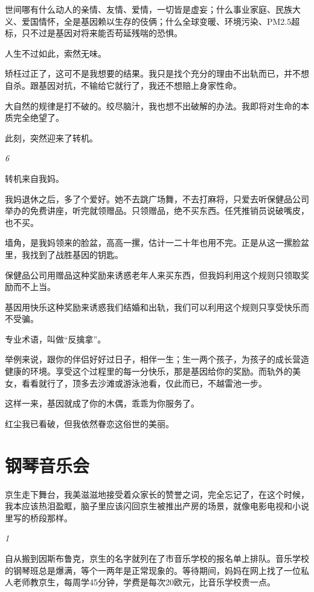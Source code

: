 \documentclass[twoside,openright,headings=optiontohead]{ctexbook} %
\begin{document}
{世间哪有什么动人的亲情、友情、爱情，一切皆是虚妄；什么事业家庭、民族大义、爱国情怀，全是基因赖以生存的伎俩；什么全球变暖、环境污染、PM2.5超标，只不过是基因对将来能否苟延残喘的恐惧。

人生不过如此，索然无味。

矫枉过正了，这可不是我想要的结果。我只是找个充分的理由不出轨而已，并不想自杀。跟基因对抗，不输给它就行了，我还不想赔上身家性命。

大自然的规律是打不破的。绞尽脑汁，我也想不出破解的办法。我即将对生命的本质完全绝望了。

此刻，突然迎来了转机。

\emph{6}

转机来自我妈。

我妈退休之后，多了个爱好。她不去跳广场舞，不去打麻将，只爱去听保健品公司举办的免费讲座，听完就领赠品。只领赠品，绝不买东西。任凭推销员说破嘴皮，也不买。

墙角，是我妈领来的脸盆，高高一摞，估计一二十年也用不完。正是从这一摞脸盆里，我找到了战胜基因的钥匙。

保健品公司用赠品这种奖励来诱惑老年人来买东西，但我妈利用这个规则只领取奖励而不上当。

基因用快乐这种奖励来诱惑我们结婚和出轨，我们可以利用这个规则只享受快乐而不受骗。

专业术语，叫做``反擒拿''。

举例来说，跟你的伴侣好好过日子，相伴一生；生一两个孩子，为孩子的成长营造健康的环境。享受这个过程里的每一分快乐，那是基因给你的奖励。而轨外的美女，看看就行了，顶多去沙滩或游泳池看，仅此而已，不越雷池一步。

这样一来，基因就成了你的木偶，乖乖为你服务了。

红尘我已看破，但我依然眷恋这俗世的美丽。

\chapter*{钢琴音乐会}\label{piano-concert}

京生走下舞台，我美滋滋地接受着众家长的赞誉之词，完全忘记了，在这个时候，我本应该热泪盈眶，脑子里应该闪回京生被推出产房的场景，就像电影电视和小说里写的桥段那样。

\emph{1}

自从搬到因斯布鲁克，京生的名字就列在了市音乐学校的报名单上排队。音乐学校的钢琴班总是爆满，等个一两年是正常现象的。等待期间，妈妈在网上找了一位私人老师教京生，每周学45分钟，学费是每次20欧元，比音乐学校贵一点。

}
\end{document}
